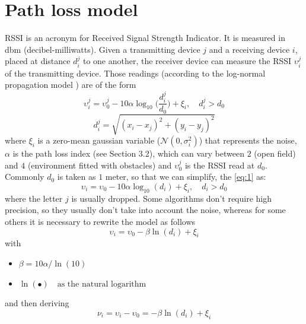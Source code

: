 \documentclass[12pt]{report}
\begin{document}
\section{Path loss model}
RSSI is an acronym for Received Signal Strength Indicator. It is measured in dbm (decibel-milliwatts). Given a transmitting device $j$ and a receiving device $i$, placed at distance $d_i^j$ to one another, the receiver device can measure the RSSI $\upsilon_i^j$ of the transmitting device. Those readings (according to the log-normal propagation model  \cite{MUNOZ200923}) are of the form
\begin{equation}
\upsilon_i^j = \upsilon_0^j-10\alpha\log_{10}\bigg(\frac{d_i^j}{d_0}\bigg) + \xi_i, \quad d_i^j>d_0
\label{eq:1}
\end{equation}
\begin{equation}
    d_i^j=\sqrt{(x_i-x_j)^2+(y_i-y_j)^2}
\end{equation}
where $\xi_i$ is a zero-mean gaussian variable ($\mathcal{N}(0,\sigma^2_i)$) that represents the noise, $\alpha$ is the path loss index (see Section 3.2), which can vary between $2$ (open field) and $4$ (environment fitted with obstacles) and $\upsilon_0^j$ is the RSSI read at $d_0$. Commonly $d_0$ is taken as $1$ meter, so that we can simplify, the \eqref{eq:1} as:
\begin{equation}
\upsilon_i = \upsilon_0-10\alpha\log_{10}(d_i) + \xi_i, \quad d_i>d_0
\label{eq:2}
\end{equation}
where the letter $j$ is usually dropped.
Some algorithms don't require high precision, so they usually don't take into account the noise, whereas for some others it is necessary to rewrite the model as follows
\begin{equation}
\upsilon_i= \upsilon_0-\beta\ln(d_i) + \xi_i
\end{equation}
with
\begin{itemize}
    \item $\beta=10\alpha/\ln(10)$
    \item $\ln(\bullet)\quad \text{as the natural logarithm}$
\end{itemize}
and then deriving
\begin{equation}
\nu_i = \upsilon_i-\upsilon_0= -\beta\ln(d_i) + \xi_i
\label{eq:5}
\end{equation}
\clearpage
\end{document}
